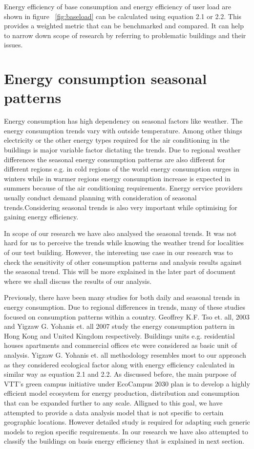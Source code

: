 Energy efficiency of base consumption and energy efficiency of user load are shown in figure ~\ref{fig:baseload} can be calculated using equation 2.1 or 2.2. This provides a weighted metric that can be benchmarked and compared. It can help to narrow down scope of research by referring to problematic buildings and their issues.

\section{Energy consumption seasonal patterns}\label{seasonal}
Energy consumption has high dependency on seasonal factors like weather. The energy consumption trends vary with outside temperature. Among other things electricity or the other energy types required for the air conditioning in the buildings is major variable factor dictating the trends. Due to regional weather differences the seasonal energy consumption patterns are also different for different regions e.g. in cold regions of the world energy consumption surges in winters while in warmer regions energy consumption increase is expected in summers because of the air conditioning requirements. Energy service providers usually conduct demand planning with consideration of seasonal trends.Considering seasonal trends is also very important while optimising for gaining energy efficiency. 

In scope of our research we have also analysed the seasonal trends. It was not hard for us to perceive the trends while knowing the weather trend for localities of our test building. However, the interesting use case in our research was to check the sensitivity of other consumption patterns and analysis results against the seasonal trend. This will be more explained in the later part of document where we shall discuss the results of our analysis.

Previously, there have been many studies for both daily and seasonal trends in energy consumption. Due to regional differences in trends, many of these studies focused on consumption patterns within a country. Geoffrey K.F. Tso et. all, 2003\cite{tso2003study} and Yigzaw G. Yohanis et. all 2007\cite{yohanis2008real} study the energy consumption pattern in Hong Kong and United Kingdom respectively. Buildings units e.g. residential houses apartments and commercial offices etc were considered as basic unit of analysis. Yigzaw G. Yohanis et. all methodology resembles most to our approach as they considered ecological factor along with energy efficiency calculated in similar way as equation 2.1 and 2.2. As discussed before, the main purpose of VTT's green campus initiative under EcoCampus 2030 plan is to develop a highly efficient model ecosystem for energy production, distribution and consumption that can be expanded further to any scale. Alligned to this goal, we have attempted to provide a data analysis model that is not specific to certain geographic locations. However detailed study is required for adapting such generic models to region specific requirements. In our research we have also attempted to classify the buildings on basis energy efficiency that is explained in next section.

